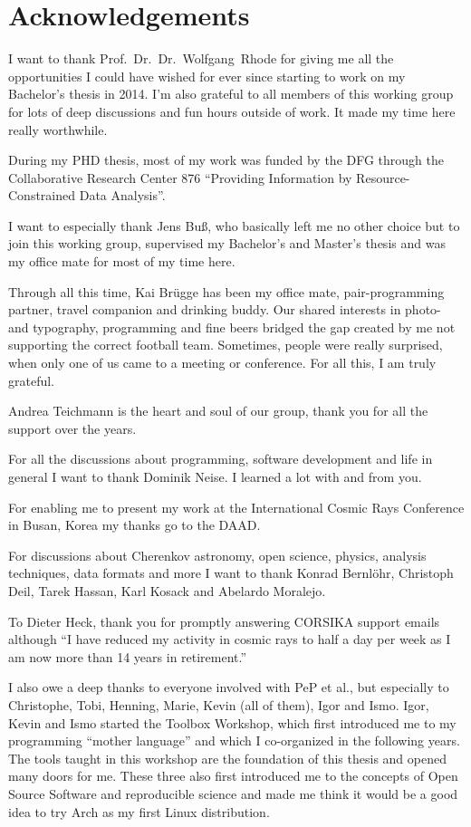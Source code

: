\chapter{Acknowledgements}

I want to thank Prof.~Dr.~Dr.~Wolfgang~Rhode for giving me all the
opportunities I could have wished for ever since starting to work on my Bachelor's thesis
in 2014.
I'm also grateful to all members of this working group for lots of deep discussions
and fun hours outside of work.
It made my time here really worthwhile.

During my PHD thesis, most of my work was funded by the DFG through the Collaborative Research Center
876 \enquote{Providing Information by Resource-Constrained Data Analysis}.

I want to especially thank Jens Buß,
who basically left me no other choice but to join this working group,
supervised my Bachelor's and Master's thesis and was my office mate for most
of my time here.

Through all this time, Kai Brügge has been my office mate, pair-programming partner,
travel companion and drinking buddy.
Our shared interests in photo- and typography, programming and fine beers bridged the
gap created by me not supporting the correct football team.
Sometimes, people were really surprised, when only one of us came to a meeting or conference.
For all this, I am truly grateful. 

Andrea Teichmann is the heart and soul of our group,
thank you for all the support over the years.

For all the discussions about programming, software development and life in general I want to thank Dominik Neise.
I learned a lot with and from you.

For enabling me to present my work at the International Cosmic Rays Conference 
in Busan, Korea my thanks go to the DAAD.

For discussions about Cherenkov astronomy, open science, physics, analysis techniques, data formats
and more I want to thank Konrad Bernlöhr, Christoph Deil, Tarek Hassan, Karl Kosack and Abelardo Moralejo.

To Dieter Heck, thank you for promptly answering CORSIKA
support emails although \enquote{I have reduced my
activity in cosmic rays to half a day per week as I am now more than 14 years in
retirement.}

I also owe a deep thanks to everyone involved with PeP et al., but especially to Christophe, Tobi, Henning, Marie, Kevin (all of them), Igor and Ismo.
Igor, Kevin and Ismo started the Toolbox Workshop,
which first introduced me to my programming \enquote{mother language} and which I co-organized in the following years.
The tools taught in this workshop are the foundation of this thesis and opened many doors
for me.
These three also first introduced me to the concepts of Open Source Software and reproducible science
and made me think it would be a good idea to try Arch as my first Linux distribution.

